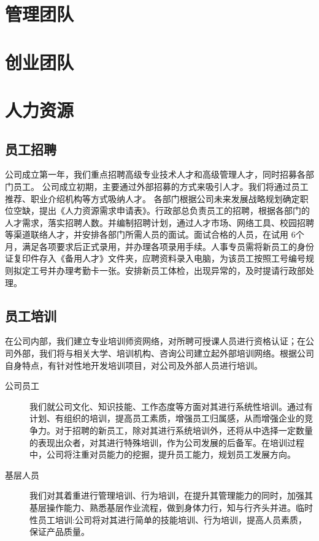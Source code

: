 \documentclass[violet]{main}
\begin{document}
						\section{管理团队}
						\section{创业团队}
						\section{人力资源}
							\subsection{员工招聘}
							\begin{center}
								\Tcbset{}
							\end{center}
								公司成立第一年，我们重点招聘高级专业技术人才和高级管理人才，同时招募各部门员工。
								公司成立初期，主要通过外部招募的方式来吸引人才。我们将通过员工推荐、职业介绍机构等方式吸纳人才。
								各部门根据公司未来发展战略规划确定职位空缺，提出《人力资源需求申请表》。行政部总负责员工的招聘，根据各部门的人才需求，落实招聘人数。并编制招聘计划，通过人才市场、网络工具、校园招聘等渠道联络人才，并安排各部门所需人员的面试。面试合格的人员，在试用 6个月，满足各项要求后正式录用，并办理各项录用手续。人事专员需将新员工的身份证复印件存入《备用人才》文件夹，应聘资料录入电脑，为该员工按照工号编号规则拟定工号并办理考勤卡一张。安排新员工体检，出现异常的，及时提请行政部处理。
			\subsection{员工培训}
				在公司内部，我们建立专业培训师资网络，对所聘可授课人员进行资格认证；在公司外部，我们将与相关大学、培训机构、咨询公司建立起外部培训网络。根据公司自身特点，有针对性地开发培训项目，对公司及外部人员进行培训。
				\begin{description}
					\item[公司员工]我们就公司文化、知识技能、工作态度等方面对其进行系统性培训。通过有计划、有组织的培训，提高员工素质，增强员工归属感，从而增强企业的竞争力。对于招聘的新员工，除对其进行系统培训外，还将从中选择一定数量的表现出众者，对其进行特殊培训，作为公司发展的后备军。在培训过程中，公司将注重对员能力的挖掘，提升员工能力，规划员工发展方向。
					\item[基层人员]我们对其着重进行管理培训、行为培训，在提升其管理能力的同时，加强其基层操作能力、熟悉基层作业流程，做到身体力行，知与行齐头并进。临时性员工培训:公司将对其进行简单的技能培训、行为培训，提高人员素质，保证产品质量。
				\end{description}
\end{document}

